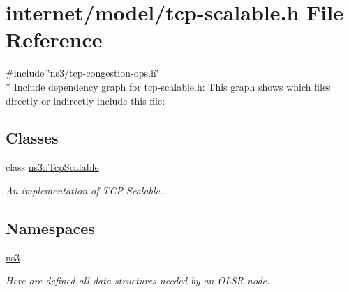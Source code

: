 \hypertarget{tcp-scalable_8h}{}\section{internet/model/tcp-\/scalable.h File Reference}
\label{tcp-scalable_8h}
{\ttfamily \#include \char`\"{}ns3/tcp-\/congestion-\/ops.\+h\char`\"{}}\\*
Include dependency graph for tcp-\/scalable.h\+:
This graph shows which files directly or indirectly include this file\+:
\subsection*{Classes}
\begin{DoxyCompactItemize}
\item 
class \hyperlink{classns3_1_1TcpScalable}{ns3\+::\+Tcp\+Scalable}
\begin{DoxyCompactList}\small\item\em An implementation of T\+CP Scalable. \end{DoxyCompactList}\end{DoxyCompactItemize}
\subsection*{Namespaces}
\begin{DoxyCompactItemize}
\item 
 \hyperlink{namespacens3}{ns3}
\begin{DoxyCompactList}\small\item\em Here are defined all data structures needed by an O\+L\+SR node. \end{DoxyCompactList}\end{DoxyCompactItemize}
